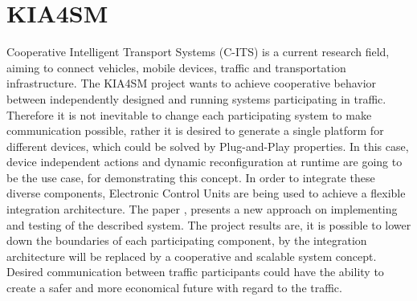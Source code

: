 \section{KIA4SM}
Cooperative Intelligent Transport Systems (C-ITS) is a current research field, aiming to connect vehicles, mobile devices, traffic and transportation infrastructure\cite{kia4sm}. The KIA4SM project wants to achieve cooperative behavior between independently designed and running systems participating in traffic. Therefore it is not inevitable to change each participating system to make communication possible, rather it is desired to generate a single platform for different devices, which could be solved by Plug-and-Play properties. In this case, device independent actions and dynamic reconfiguration at runtime are going to be the use case, for demonstrating this concept. In order to integrate these diverse components, Electronic Control Units are being used to achieve a flexible integration architecture. 
The paper \cite{kia4sm}, presents a new approach on implementing and testing of the described system.
The project results are, it is possible to lower down the boundaries of each participating component, by the integration architecture will be replaced by a cooperative and scalable system concept. 
Desired communication between traffic participants could have the ability to create a safer and more economical future with regard to the traffic. 